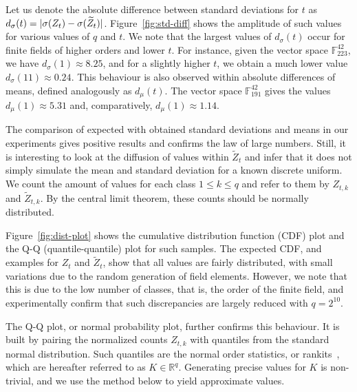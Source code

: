 \documentclass[english]{ufsc-thesis-rn46-2019/ufsc-thesis-rn46-2019}
\DeclarePairedDelimiter\abs{\lvert}{\rvert}
\theoremstyle{definition}
\begin{document}
Let us denote the absolute difference between standard deviations for $t$ as
$d_{\sigma}(t) = \abs{\sigma(Z_{t}) - \sigma(\widetilde{Z}_{t})}$.
Figure~\ref{fig:std-diff} shows the amplitude of such values for various values
of $q$ and $t$. We note that the largest values of $d_{\sigma}(t)$ occur for
finite fields of higher orders and lower $t$. For instance, given the vector
space $\mathbb{F}_{223}^{42}$, we have $d_{\sigma}(1) \approx 8.25$, and for
a slightly higher $t$, we obtain a much lower value
$d_{\sigma}(11) \approx 0.24$. This behaviour is also observed within absolute
differences of means, defined analogously as $d_{\mu}(t)$. The vector space
$\mathbb{F}_{191}^{42}$ gives the values $d_{\mu}(1) \approx 5.31$ and,
comparatively, $d_{\mu}(1) \approx 1.14$.

The comparison of expected with obtained standard deviations and means in our
experiments gives positive results and confirms the law of large
numbers. Still, it is interesting to look at the diffusion of values within
$\widetilde{Z}_{t}$ and infer that it does not simply simulate the mean and
standard deviation for a known discrete uniform. We count the amount of values
for each class $1 \leq k \leq q$ and refer to them by $Z_{t, k}$ and
$\widetilde{Z}_{t, k}$. By the central limit theorem, these counts should be
normally distributed.

Figure~\ref{fig:dist-plot} shows the cumulative distribution function (CDF)
plot and the Q-Q (quantile-quantile) plot for such samples. The expected CDF,
and examples for $Z_{t}$ and $\widetilde{Z}_{t}$, show that all values are
fairly distributed, with small variations due to the random generation of field
elements. However, we note that this is due to the low number of classes, that
is, the order of the finite field, and experimentally confirm that such
discrepancies are largely reduced with $q = 2^{10}$.

The Q-Q plot, or normal probability plot, further confirms this behaviour. It
is built by pairing the normalized counts $Z_{t, k}$ with quantiles from the
standard normal distribution. Such quantiles are the normal order statistics,
or rankits~\cite[p.~349]{Ipsen:194405}, which are hereafter referred to as $K
\in \mathbb{R}^{q}$. Generating precise values for $K$ is non-trivial, and we
use the method below to yield approximate values.
\end{document}
